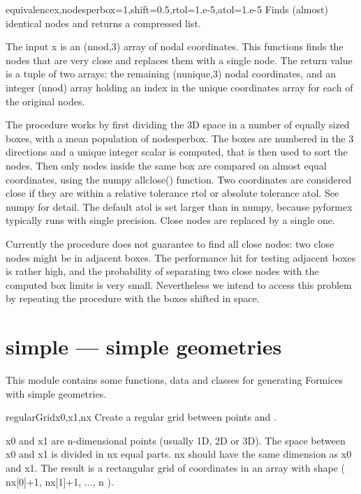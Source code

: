 \begin{funcdesc}{equivalence}{x,nodesperbox=1,shift=0.5,rtol=1.e-5,atol=1.e-5}
    Finds (almost) identical nodes and returns a compressed list.

    The input x is an (nnod,3) array of nodal coordinates. This functions finds
    the nodes that are very close and replaces them with a single node.
    The return value is a tuple of two arrays: the remaining (nunique,3) nodal
    coordinates, and an integer (nnod) array holding an index in the unique
    coordinates array for each of the original nodes.

    The procedure works by first dividing the 3D space in a number of
    equally sized boxes, with a mean population of nodesperbox.
    The boxes are numbered in the 3 directions and a unique integer scalar
    is computed, that is then used to sort the nodes.
    Then only nodes inside the same box are compared on almost equal
    coordinates, using the numpy allclose() function. Two coordinates are
    considered close if they are within a relative tolerance rtol or absolute
    tolerance atol. See numpy for detail. The default atol is set larger than
    in numpy, because pyformex typically runs with single precision.
    Close nodes are replaced by a single one.

    Currently the procedure does not guarantee to find all close nodes:
    two close nodes might be in adjacent boxes. The performance hit for
    testing adjacent boxes is rather high, and the probability of separating
    two close nodes with the computed box limits is very small. Nevertheless
    we intend to access this problem by repeating the procedure with the
    boxes shifted in space.
\end{funcdesc}
    


\section{simple --- simple geometries}
\label{sec:simple}
This module contains some functions, data and classes for generating Formices with simple geometries. 


\begin{funcdesc}{regularGrid}{x0,x1,nx}
  Create a regular grid between points  and .

  x0 and x1 are n-dimensional points (usually 1D, 2D or 3D).
  The space between x0 and x1 is divided in nx equal parts. nx should have
  the same dimension as x0 and x1.
  The result is a rectangular grid of coordinates in an array with
  shape ( nx[0]+1, nx[1]+1, ..., n ).
\end{funcdesc}


